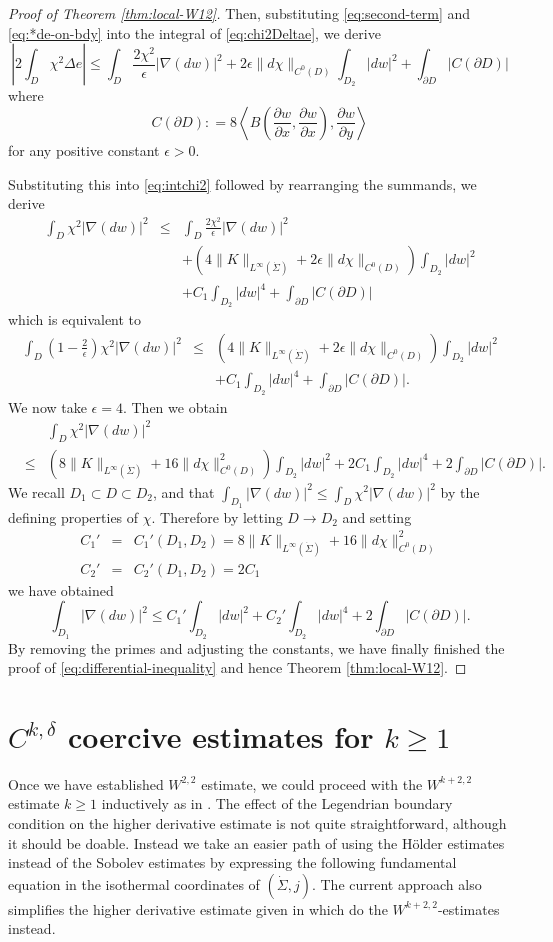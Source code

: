 \documentclass[reqno]{amsart}
\newcommand{\del}{\partial}
\newcommand{\beastar}{\begin{eqnarray*}}
\newcommand{\eeastar}{\end{eqnarray*}}
\theoremstyle{theorem}
\theoremstyle{definition}
\numberwithin{equation}{section}
\begin{document}
\begin{proof} [Proof of Theorem \ref{thm:local-W12}]
Then, substituting \eqref{eq:second-term} and \eqref{eq:*de-on-bdy} into the integral of \eqref{eq:chi2Deltae},
we derive
$$
\left|2\int_{D}\chi^2\Delta e\right|  \leq
\int_D\frac{2\chi^2}{\epsilon}|\nabla(dw)|^2
+ 2\epsilon \|d\chi\|_{C^0(D)}\int_{D_2}|dw|^2 + \int_{\del D} |C(\del D)|
$$
where
$$
C(\del D): = 8
\left \langle B\left(\frac{\del w}{\del x},
 \frac{\del w}{\del x}\right),\frac{\del w}{\del y}\right \rangle
$$
for any positive constant $\epsilon > 0$.

Substituting this into \eqref{eq:intchi2} followed by rearranging the summands, we derive
\beastar
\int_{D}\chi^2|\nabla(dw)|^2
&\leq& \int_D\frac{2\chi^2}{\epsilon}|\nabla(dw)|^2\\
&{}&+\left(4\|K\|_{L^\infty(\dot\Sigma)}+2\epsilon \|d\chi\|_{C^0(D)}\right)\int_{D_2}|dw|^2\\
&{}&+C_1\int_{D_2}|dw|^4 + \int_{\del D} | C(\del D)|
\eeastar
which is equivalent to
\beastar
\int_D \left(1 - \frac{2}{\epsilon}\right) \chi^2 |\nabla(dw)|^2
&\leq &\left(4\|K\|_{L^\infty(\dot\Sigma)}+2\epsilon \|d\chi\|_{C^0(D)}\right)\int_{D_2}|dw|^2\\
&{}&+C_1\int_{D_2}|dw|^4 + \int_{\del D}|C(\del D)|.
\eeastar
We now take $\epsilon=4$. Then we obtain
\beastar
&{}&\int_{D}\chi^2|\nabla(dw)|^2\nonumber\\
&\leq&\left(8\|K\|_{L^\infty(\dot\Sigma)}+16\|d\chi\|^2_{C^0(D)}\right)\int_{D_2}|dw|^2
+2C_1\int_{D_2}|dw|^4 + 2 \int_{\del D} |C(\del D)|.
\eeastar
We recall $D_1 \subset D \subset D_2$, and that $\int_{D_1}|\nabla(dw)|^2 \leq \int_{D}\chi^2|\nabla(dw)|^2$
by the defining properties of $\chi$. Therefore by
letting $D \to D_2$ and setting
\beastar
C_1' & = & C_1'(D_1,D_2) =  8\|K\|_{L^\infty(\dot\Sigma)}+16\|d\chi\|^2_{C^0(D)}\\
C_2' & = & C_2'(D_1,D_2) = 2C_1
\eeastar
 we have obtained
$$
\int_{D_1}|\nabla(dw)|^2 \leq C_1' \int_{D_2} |dw|^2 + C_2' \int_{D_2} |dw|^4
+ 2\int_{\del D} |C(\del D)|.
$$
By removing the primes and adjusting the constants,  we have finally finished
the proof of \eqref{eq:differential-inequality} and
hence Theorem \ref{thm:local-W12}.
\end{proof}

\section{$C^{k,\delta}$ coercive estimates for $k \geq 1$}
\label{sec:Ckdelta-estimates}

Once we have established $W^{2,2}$ estimate, we could proceed with the $W^{k+2,2}$ estimate $k \geq 1$
inductively as in \cite[Section 5.2]{oh-wang:CR-map1}.
The effect of the Legendrian boundary condition on
the higher derivative estimate is not quite straightforward, although it should be doable.
Instead we take an easier path of using the H\"older estimates instead of
the Sobolev estimates by expressing the following fundamental equation in
the isothermal coordinates of $(\dot \Sigma,j)$. The current approach also simplifies the higher derivative
estimate given in \cite[Section 5.2]{oh-wang:CR-map1}
which do the $W^{k+2,2}$-estimates instead.
\end{document}
